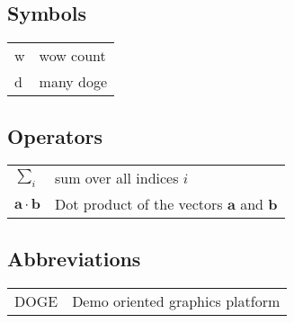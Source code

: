 
\subsection*{Symbols}

\begin{tabular}{ll}
w	& wow count\\
d	& many doge
\end{tabular}


\subsection*{Operators}

\begin{tabular}{ll}
$\sum_i $                        & sum over all indices $i$\\
$\mathbf{a} \cdot \mathbf{b}$    & Dot product of the vectors $\mathbf{a}$ and $\mathbf{b}$
\end{tabular}

\subsection*{Abbreviations}

\begin{tabular}{ll}
DOGE & Demo oriented graphics platform
\end{tabular}

